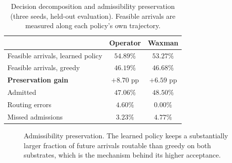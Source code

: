 \documentclass[10pt,journal,comsoc]{IEEEtran}
\begin{document}
\begin{table}[t]
\centering
\caption{Decision decomposition and admissibility preservation
(three seeds, held-out evaluation). Feasible arrivals are measured along
each policy's own trajectory.}
\label{tab:mechanism}
\renewcommand{\arraystretch}{1.2}
\begin{tabular}{lcc}
\toprule
& \textbf{Operator} & \textbf{Waxman} \\
\midrule
Feasible arrivals, learned policy & $54.89\%$ & $53.27\%$ \\
Feasible arrivals, greedy         & $46.19\%$ & $46.68\%$ \\
\textbf{Preservation gain}        & $\mathbf{+8.70}$ pp & $\mathbf{+6.59}$ pp \\
\midrule
Admitted                          & $47.06\%$ & $48.50\%$ \\
Routing errors                    & $4.60\%$  & $0.00\%$ \\
Missed admissions                 & $3.23\%$  & $4.77\%$ \\
\bottomrule
\end{tabular}
\end{table}

\begin{figure}[t]
\centering
{}
\caption{Admissibility preservation. The learned policy keeps a
substantially larger fraction of future arrivals routable than greedy on
both substrates, which is the mechanism behind its higher acceptance.}
\label{fig:mechanism}
\end{figure}
\end{document}
